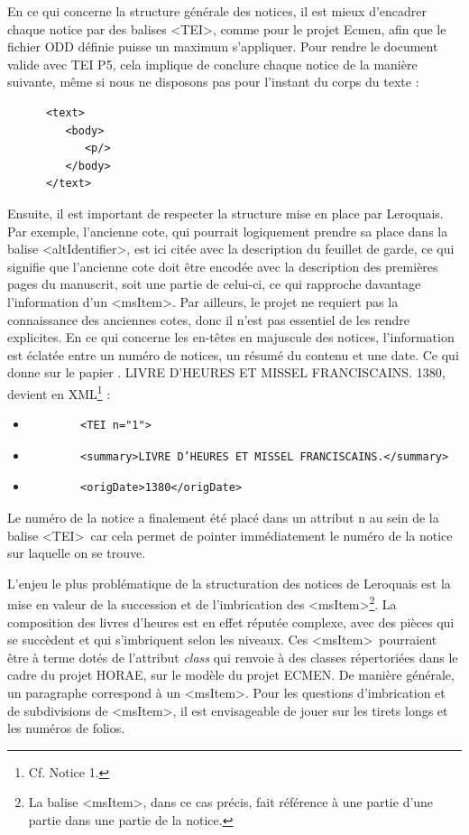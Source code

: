 \documentclass[a4paper,12pt,twoside]{book}
\begin{document}
En ce qui concerne la structure générale des notices, il est mieux d'encadrer chaque notice par des balises \textless TEI\textgreater, comme pour le projet Ecmen, afin que le fichier ODD définie puisse un maximum s’appliquer. Pour rendre le document valide avec TEI P5, cela implique de conclure chaque notice de la manière suivante, même si nous ne disposons pas pour l'instant du corps du texte :
\begin{verbatim}
      <text>
         <body>
            <p/>
         </body>
      </text>
\end{verbatim}
Ensuite, il est important de respecter la structure mise en place par Leroquais. Par exemple, l’ancienne cote, qui pourrait logiquement prendre sa place dans la balise \textless altIdentifier\textgreater, est ici citée avec la description du feuillet de garde, ce qui signifie que l’ancienne cote doit être encodée avec la description des premières pages du manuscrit, soit une partie de celui-ci, ce qui rapproche davantage l'information d'un \textless msItem\textgreater . Par ailleurs, le projet ne requiert pas la connaissance des anciennes cotes, donc il n’est pas essentiel de les rendre explicites. 
En ce qui concerne les en-têtes en majuscule des notices, l’information est éclatée entre un numéro de notices, un résumé du contenu et une date. Ce qui donne sur le papier . LIVRE D’HEURES ET MISSEL FRANCISCAINS. 1380\fg{}, devient en XML\footnote{Cf. Notice 1.} : 
\begin{itemize}
    \item \begin{verbatim}
        <TEI n="1">
    \end{verbatim}
    \item \begin{verbatim}
        <summary>LIVRE D’HEURES ET MISSEL FRANCISCAINS.</summary>
    \end{verbatim}
    \item \begin{verbatim}
        <origDate>1380</origDate>
    \end{verbatim}
\end{itemize}
Le numéro de la notice a finalement été placé dans un attribut \og n\fg{} au sein de la balise \textless TEI\textgreater~car cela permet de pointer immédiatement le numéro de la notice sur laquelle on se trouve. 

L'enjeu le plus problématique de la structuration des notices de Leroquais est la mise en valeur de la succession et de l'imbrication des \textless msItem\textgreater \footnote{La balise \textless msItem\textgreater, dans ce cas précis, fait référence à une partie d'une partie dans une partie de la notice.}. La composition des livres d’heures est en effet réputée complexe, avec des pièces qui se succèdent et qui s’imbriquent selon les niveaux. Ces \textless msItem\textgreater~pourraient être à terme dotés de l’attribut \textit{class} qui renvoie à des classes répertoriées dans le cadre du projet HORAE, sur le modèle du projet ECMEN. De manière générale, un paragraphe correspond à un \textless msItem\textgreater . Pour les questions d'imbrication et de subdivisions de \textless msItem\textgreater, il est envisageable de jouer sur les tirets longs et les numéros de folios. 
\end{document}
